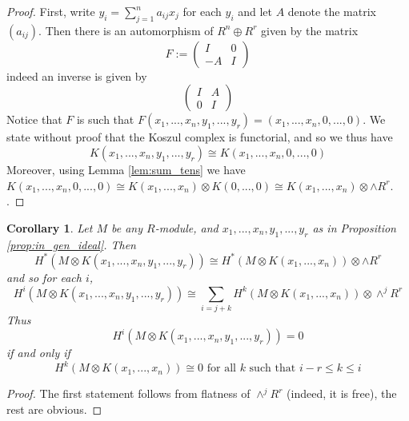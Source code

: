 \documentclass[12pt]{article}
\theoremstyle{plain}
\newtheorem{cor}[thm]{Corollary}
\theoremstyle{definition}
\begin{document}
\begin{proof}
First, write $y_i = \sum_{j = 1}^n a_{ij}x_j$ for each $y_i$ and let $A$ denote the matrix $(a_{ij})$. Then there is an automorphism of $R^n \oplus R^r$ given by the matrix
\begin{equation}
F:= \begin{pmatrix}
I & 0\\
-A & I
\end{pmatrix}
\end{equation}
indeed an inverse is given by
\begin{equation}
\begin{pmatrix}
I & A\\
0 & I
\end{pmatrix}
\end{equation}
Notice that $F$ is such that $F(x_1,...,x_n,y_1,...,y_r) = (x_1,...,x_n,0,...,0)$.  We state without proof that the Koszul complex is functorial, and so we thus have
\begin{equation}
K(x_1,...,x_n,y_1,...,y_r) \cong K(x_1,...,x_n,0,...,0)
\end{equation}
Moreover, using Lemma \ref{lem:sum_tens} we have $K(x_1,...,x_n,0,...,0) \cong K(x_1,...,x_n) \otimes K(0,...,0) \cong K(x_1,...,x_n) \otimes \wedge R^r$. .
\end{proof}
\begin{cor}
Let $M$ be any $R$-module, and $x_1,...,x_n,y_1,...,y_r$ as in Proposition \ref{prop:in_gen_ideal}. Then
\begin{equation}
H^\ast (M \otimes K(x_1,...,x_n,y_1,...,y_r))\cong H^\ast(M \otimes K(x_1,...,x_n)) \otimes \wedge R^r
\end{equation}
and so for each $i$,
\begin{equation}
H^i(M \otimes K(x_1,...,x_n,y_1,...,y_r)) \cong \sum_{i = j + k}H^k(M \otimes K(x_1,...,x_n)) \otimes \wedge^j R^r
\end{equation}
Thus
\begin{equation}
H^i(M \otimes K(x_1,...,x_n,y_1,...,y_r)) = 0
\end{equation}
if and only if
\begin{equation}
H^k(M \otimes K(x_1,...,x_n)) \cong 0\text{ for all }k\text{ such that }i-r \leq k \leq i
\end{equation}
\end{cor}
\begin{proof}
The first statement follows from flatness of $\wedge^j R^r$ (indeed, it is free), the rest are obvious.
\end{proof}
\end{document}
